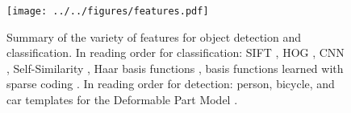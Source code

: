 \begin{figure}[ht]
\centering
\texttt{[image: ../../figures/features.pdf]}
\caption[Summary of the variety of features for object detection and classification.]{
Summary of the variety of features for object detection and classification.
In reading order for classification: SIFT \parencite{Lowe2004}, HOG \parencite{Dalal2005}, CNN \parencite{Krizhevsky-NIPS-2012}, Self-Similarity \parencite{Shechtman2007}, Haar basis functions \parencite{Viola-IJCV-2004}, basis functions learned with sparse coding \parencite{Olshausen1996}.
In reading order for detection: person, bicycle, and car templates for the Deformable Part Model \parencite{Felzenszwalb2010a}.
}\label{fig:features}
\end{figure}
